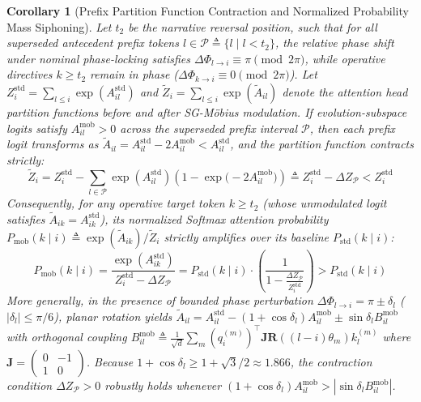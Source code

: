 \documentclass[11pt,a4paper]{article}
\newtheorem{corollary}[theorem]{Corollary}
\theoremstyle{definition}
\begin{document}
\begin{corollary}[Prefix Partition Function Contraction and Normalized Probability Mass Siphoning]
\label{cor:partition_siphoning}
Let $t_2$ be the narrative reversal position, such that for all superseded antecedent prefix tokens $l \in \mathcal{P} \triangleq \{l \mid l < t_2\}$, the relative phase shift under nominal phase-locking satisfies $\Delta\Phi_{l \to i} \equiv \pi \pmod{2\pi}$, while operative directives $k \ge t_2$ remain in phase ($\Delta\Phi_{k \to i} \equiv 0 \pmod{2\pi}$). Let $Z_i^{\mathrm{std}} = \sum_{l \le i} \exp(A_{il}^{\mathrm{std}})$ and $\tilde{Z}_i = \sum_{l \le i} \exp(\tilde{A}_{il})$ denote the attention head partition functions before and after SG-M\"obius modulation.
If evolution-subspace logits satisfy $A_{il}^{\mathrm{mob}} > 0$ across the superseded prefix interval $\mathcal{P}$, then each prefix logit transforms as $\tilde{A}_{il} = A_{il}^{\mathrm{std}} - 2A_{il}^{\mathrm{mob}} < A_{il}^{\mathrm{std}}$, and the partition function contracts strictly:
\begin{equation}
\tilde{Z}_i = Z_i^{\mathrm{std}} - \sum_{l \in \mathcal{P}} \exp(A_{il}^{\mathrm{std}})\left(1 - \exp\big(-2 A_{il}^{\mathrm{mob}}\big)\right) \triangleq Z_i^{\mathrm{std}} - \Delta Z_{\mathcal{P}} < Z_i^{\mathrm{std}}
\end{equation}
Consequently, for any operative target token $k \ge t_2$ (whose unmodulated logit satisfies $\tilde{A}_{ik} = A_{ik}^{\mathrm{std}}$), its normalized Softmax attention probability $P_{\mathrm{mob}}(k \mid i) \triangleq \exp(\tilde{A}_{ik})/\tilde{Z}_i$ strictly amplifies over its baseline $P_{\mathrm{std}}(k \mid i)$:
\begin{equation}
P_{\mathrm{mob}}(k \mid i) = \frac{\exp(A_{ik}^{\mathrm{std}})}{Z_i^{\mathrm{std}} - \Delta Z_{\mathcal{P}}} = P_{\mathrm{std}}(k \mid i) \cdot \left(\frac{1}{1 - \frac{\Delta Z_{\mathcal{P}}}{Z_i^{\mathrm{std}}}}\right) > P_{\mathrm{std}}(k \mid i)
\end{equation}
More generally, in the presence of bounded phase perturbation $\Delta\Phi_{l \to i} = \pi \pm \delta_l$ ($|\delta_l| \le \pi/6$), planar rotation yields $\tilde{A}_{il} = A_{il}^{\mathrm{std}} - (1 + \cos\delta_l)A_{il}^{\mathrm{mob}} \pm \sin\delta_l B_{il}^{\mathrm{mob}}$ with orthogonal coupling $B_{il}^{\mathrm{mob}} \triangleq \frac{1}{\sqrt{d}}\sum_m (q_i^{(m)})^\top \mathbf{J} \mathbf{R}((l-i)\theta_m) k_l^{(m)}$ where $\mathbf{J} = \begin{pmatrix} 0 & -1 \\ 1 & 0 \end{pmatrix}$. Because $1 + \cos\delta_l \ge 1 + \sqrt{3}/2 \approx 1.866$, the contraction condition $\Delta Z_{\mathcal{P}} > 0$ robustly holds whenever $(1+\cos\delta_l)A_{il}^{\mathrm{mob}} > |\sin\delta_l B_{il}^{\mathrm{mob}}|$.

\end{corollary}
\end{document}
